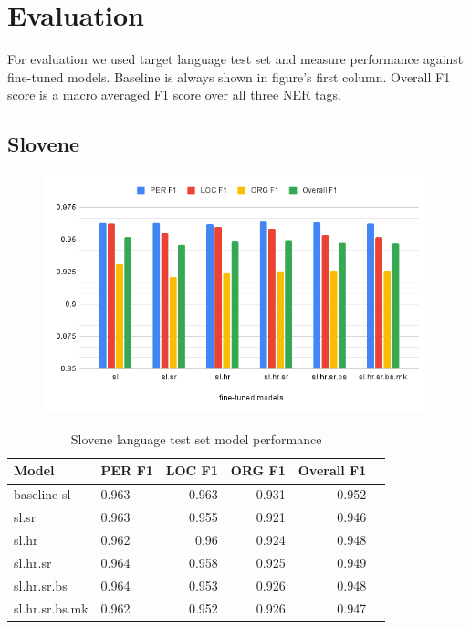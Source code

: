 \documentclass[sigconf]{acmart}
\begin{document}
\section{Evaluation}
For evaluation we used target language test set and measure performance against fine-tuned models.
Baseline is always shown in figure's first column.
Overall F1 score is a macro averaged F1 score over all three NER tags.

\subsection{Slovene}

\begin{figure}[H]
  \label{fig:eval_sl}
  \centering
  \includegraphics[width=\linewidth]{eval_sl}
\end{figure}

\begin{table}[H]
  \caption{Slovene language test set model performance}
  \label{tab:eval_sl}
  \begin{tabular}{llrrrr}
    \toprule
    Model&PER F1&LOC F1&ORG F1&Overall F1\\
    \midrule
    baseline sl&0.963&0.963&0.931&0.952\\
    \midrule
    sl.sr&0.963&0.955&0.921&0.946\\
    sl.hr&0.962&0.96&0.924&0.948\\
    sl.hr.sr&0.964&0.958&0.925&0.949\\
    sl.hr.sr.bs&0.964&0.953&0.926&0.948\\
    sl.hr.sr.bs.mk&0.962&0.952&0.926&0.947\\
    \bottomrule
  \end{tabular}
\end{table}
\end{document}
